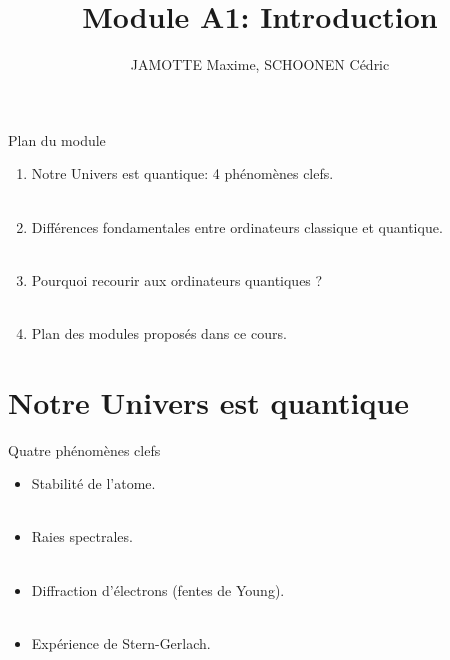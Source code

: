 \documentclass[aspectratio=169,12pt]{beamer}
\title[Module A1]{Module A1: Introduction}
\author{JAMOTTE Maxime, SCHOONEN Cédric}
\institute{Digital Learning Hub}
\date{}
\begin{document}
\begin{frame}
  \titlepage
\end{frame}

\begin{frame}{Plan du module}
  \begin{enumerate}
    \item Notre Univers est quantique: 4 phénomènes clefs.
    \\~\\
    \item Différences fondamentales entre ordinateurs classique et quantique.
    \\~\\
    \item Pourquoi recourir aux ordinateurs quantiques ?
    \\~\\
    \item Plan des modules proposés dans ce cours.
  \end{enumerate}
\end{frame}

\section{Notre Univers est quantique}

\begin{frame}{Quatre phénomènes clefs}
  \begin{itemize}
    \item Stabilité de l'atome.\\~\\
    \item Raies spectrales.\\~\\
    \item Diffraction d'électrons (fentes de Young).\\~\\
    \item Expérience de Stern-Gerlach.
  \end{itemize}
\end{frame}
\end{document}
